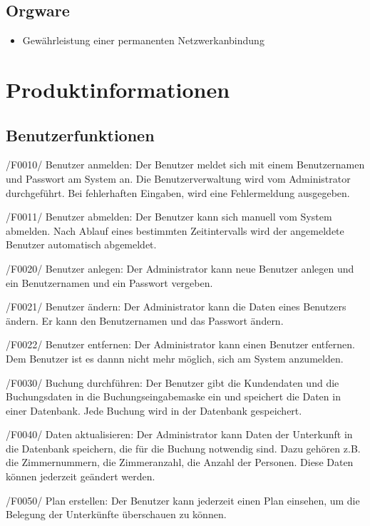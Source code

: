 \documentclass[a4paper,oneside]{scrreprt}
\begin{document}
\section{Orgware}

\begin{itemize}
\item Gewährleistung einer permanenten Netzwerkanbindung
\end{itemize}

\chapter{Produktinformationen}

\section{Benutzerfunktionen}

/F0010/ Benutzer anmelden: 
Der Benutzer meldet sich mit einem Benutzernamen und Passwort am System an. Die Benutzerverwaltung wird vom Administrator durchgeführt. Bei fehlerhaften Eingaben, wird eine Fehlermeldung ausgegeben.

/F0011/ Benutzer abmelden:
Der Benutzer kann sich manuell vom System abmelden. Nach Ablauf eines bestimmten Zeitintervalls wird der angemeldete Benutzer automatisch abgemeldet. 

/F0020/ Benutzer anlegen: 
Der Administrator kann neue Benutzer anlegen und ein Benutzernamen und ein Passwort vergeben.

/F0021/ Benutzer ändern: 
Der Administrator kann die Daten eines Benutzers ändern. Er kann den Benutzernamen und das Passwort ändern.

/F0022/ Benutzer entfernen: 
Der Administrator kann einen Benutzer entfernen. Dem Benutzer ist es dannn nicht mehr möglich, sich am System anzumelden.
 
/F0030/ Buchung durchführen: 
Der Benutzer gibt die Kundendaten und die Buchungsdaten in die Buchungseingabemaske ein und speichert die Daten in einer Datenbank. Jede Buchung wird in der Datenbank gespeichert.

/F0040/ Daten aktualisieren: 
Der Administrator kann Daten der Unterkunft in die Datenbank speichern, die für die Buchung notwendig sind. Dazu gehören z.B. die Zimmernummern, die Zimmeranzahl, die Anzahl der Personen. Diese Daten können jederzeit geändert werden.

/F0050/ Plan erstellen: 
Der Benutzer kann jederzeit einen Plan einsehen, um die Belegung der Unterkünfte überschauen zu können.
\end{document}
